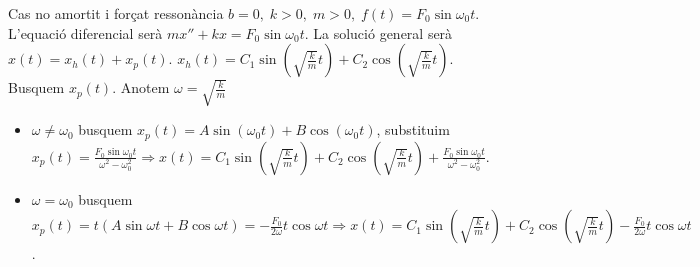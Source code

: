 \documentclass[../main.tex]{subfiles}
\begin{document}
Cas no amortit i forçat ressonància $b=0,\;k>0,\;m>0,\;f(t) = F_0\sin{\omega_0t}$. L'equació diferencial serà $mx'' + kx = F_0\sin{\omega_0t}$. La solució general serà $x(t) = x_h(t) + x_p(t)$. $x_h(t) =  C_1\sin(\sqrt{\frac{k}{m}}t) + C_2\cos(\sqrt{\frac{k}{m}}t)$. Busquem $x_p(t)$. Anotem $\omega = \sqrt{\frac{k}{m}}$
	\begin{itemize}
		\item $\omega \neq \omega_0$ busquem
		$x_p(t)=A\sin{\left(\omega_0 t\right)} + B\cos{\left(\omega_0 t\right)}$, substituim $x_p(t) = \frac{F_0\sin{\omega_0 t}}{\omega^2-\omega_0^2} \Rightarrow x(t) = C_1\sin{\left(\sqrt{\frac{k}{m}}t\right)} + C_2\cos{\left(\sqrt{\frac{k}{m}}t\right)} + \frac{F_0\sin{\omega_0 t}}{\omega^2-\omega_0^2}$.
		\item $\omega = \omega_0$ busquem
		$x_p(t)=t(A\sin{\omega t} + B\cos{\omega t}) = - \frac{F_0}{2\omega}t\cos{\omega t} \Rightarrow x(t) = C_1\sin{\left(\sqrt{\frac{k}{m}}t\right)} + C_2\cos{\left(\sqrt{\frac{k}{m}}t\right)} - \frac{F_0}{2\omega}t\cos{\omega t}$.
	\end{itemize}
\end{document}
